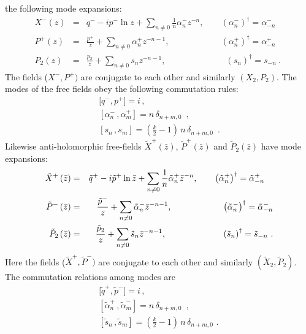 \documentclass[a4paper,12pt]{article}
\begin{document}
the following mode expansions:
\begin{eqnarray}
X^{-}\left( z\right) &=&q^{-}-ip^{-}\ln z+\sum_{n\neq 0}\frac{1}{n}\alpha
_{n}^{-}z^{-n},\qquad \left( \alpha _{n}^{-}\right) ^{\dagger }=\alpha
_{-n}^{-}\quad  \label{x-} \\
P^{+}\left( z\right) &=&\frac{p^{+}}{z}+\sum_{n\neq 0}\alpha
_{n}^{+}z^{-n-1},\qquad \qquad \qquad \left( \alpha _{n}^{+}\right)
^{\dagger }=\alpha _{-n}^{+}  \label{p+} \\
P_{2}\left( z\right) &=&\frac{p_{2}}{z}+\sum_{n\neq 0}s_{n}z^{-n-1},\qquad
\qquad \qquad \quad \left( s_{n}\right) ^{\dagger }=s_{-n}\ .  \label{p2}
\end{eqnarray}
The fields ($X^{-},P^{+})$ are conjugate to each other and similarly $\left(
X_{2},P_{2}\right) $. The modes of the free fields obey the following
commutation rules:
\begin{equation}
\begin{array}{l}
\lbrack q^{-},p^{+}]=i\,, \\
\left[ \alpha _{n}^{-}\,,\alpha _{m}^{+}\right] =n\,\delta _{n+m,0}\,\,\,,
\\
\left[ s_{n}\,,s_{m}\right] =\left( \frac{k}{2}-1\right) \,n\,\delta
_{n+m,0}\,\,\,.
\end{array}
\label{commutators}
\end{equation}
Likewise anti-holomorphic free-fields $\tilde{X}^{+}\left( \bar{z}\right) $,
$\tilde{P}^{+}\left( \bar{z}\right) $ and $\tilde{P}_{2}\left( \bar{z}%
\right) $ have mode expansions:
\begin{eqnarray}
\tilde{X}^{+}\left( \bar{z}\right) &=&\tilde{q}^{+}-i\tilde{p}^{+}\ln \bar{z}%
+\sum_{n\neq 0}\frac{1}{n}\tilde{\alpha}_{n}^{+}\bar{z}^{-n},\qquad \left(
\tilde{\alpha}_{n}^{+}\right) ^{\dagger }=\tilde{\alpha}_{-n}^{+}\quad
\label{x+} \\
\tilde{P}^{-}\left( \bar{z}\right) &=&\frac{\tilde{p}^{-}}{z}+\sum_{n\neq 0}%
\tilde{\alpha}_{n}^{-}\bar{z}^{-n-1},\qquad \qquad \qquad \left( \tilde{%
\alpha}_{n}^{-}\right) ^{\dagger }=\tilde{\alpha}_{-n}^{-}  \label{p-} \\
\tilde{P}_{2}\left( \bar{z}\right) &=&\frac{\tilde{p}_{2}}{z}+\sum_{n\neq 0}%
\tilde{s}_{n}\bar{z}^{-n-1},\qquad \qquad \qquad \ \ \left( \tilde{s}%
_{n}\right) ^{\dagger }=\tilde{s}_{-n}\ .  \label{ap2}
\end{eqnarray}
Here the fields ($\tilde{X}^{+},\tilde{P}^{-})$ are conjugate to each other
and similarly $\left( \tilde{X}_{2},\tilde{P}_{2}\right) $. The commutation
relations among modes are
\begin{equation}
\begin{array}{l}
\lbrack \tilde{q}^{+},\tilde{p}^{-}]=i\,, \\
\left[ \tilde{\alpha}_{n}^{+}\,,\tilde{\alpha}_{m}^{-}\right] =n\,\delta
_{n+m,0}\,\,\,, \\
\left[ \tilde{s}_{n}\,,\tilde{s}_{m}\right] =\left( \frac{k}{2}-1\right)
\,n\,\delta _{n+m,0}\,\,.\,
\end{array}
\label{acommutators}
\end{equation}
\end{document}
